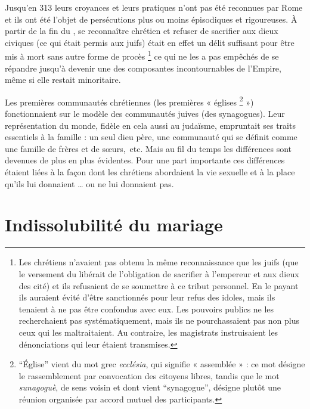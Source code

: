 Jusqu'en 313 leurs croyances et leurs pratiques n'ont pas été reconnues par Rome et ils ont été l'objet de persécutions plus ou moins épisodiques et rigoureuses. À partir de la fin du , se reconnaître chrétien et refuser de sacrifier aux dieux civiques (ce qui était permis aux juifs) était en effet un délit suffisant pour être mis à mort sans autre forme de procès%
\footnote{Les chrétiens n'avaient pas obtenu la même reconnaissance que les juifs (que le versement du  libérait de l'obligation de sacrifier à l'empereur et aux dieux des cité) et ils refusaient de se soumettre à ce tribut personnel. En le payant ils auraient évité d'être sanctionnés pour leur refus des idoles, mais ils tenaient à ne pas être confondus avec eux. Les pouvoirs publics ne les recherchaient pas systématiquement, mais ils ne pourchassaient pas non plus ceux qui les maltraitaient. Au contraire, les magistrats instruisaient les dénonciations qui leur étaient transmises.}
ce qui ne les a pas empêchés de se répandre jusqu'à devenir une des composantes incontournables de l'Empire, même si elle restait minoritaire. 

 Les premières communautés chrétiennes (les premières « églises%
\footnote{\enquote{Église} vient du mot grec \emph{ecclésia}, qui signifie « assemblée » : ce mot désigne le rassemblement par convocation des citoyens libres, tandis que le mot \emph{sunagoguè}, de sens voisin et dont vient \enquote{synagogue}, désigne plutôt une réunion organisée par accord mutuel des participants.}
») fonctionnaient sur le modèle des communautés juives (des synagogues). Leur représentation du monde, fidèle en cela aussi au judaïsme, empruntait ses traits essentiels à la famille : un seul dieu père, une communauté qui se définit comme une famille de frères et de sœurs,~etc. Mais au fil du temps les différences sont devenues de plus en plus évidentes. Pour une part importante ces différences étaient liées à la façon dont les chrétiens abordaient la vie sexuelle et à la place qu'ils lui donnaient … ou ne lui donnaient pas. 


\section{Indissolubilité du mariage}

